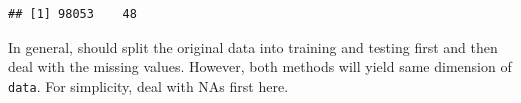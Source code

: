 \documentclass[]{article}
\newenvironment{Shaded}{\begin{snugshade}}{\end{snugshade}}
\newcommand{\KeywordTok}[1]{\textcolor[rgb]{0.13,0.29,0.53}{\textbf{{#1}}}}
\newcommand{\DataTypeTok}[1]{\textcolor[rgb]{0.13,0.29,0.53}{{#1}}}
\newcommand{\DecValTok}[1]{\textcolor[rgb]{0.00,0.00,0.81}{{#1}}}
\newcommand{\StringTok}[1]{\textcolor[rgb]{0.31,0.60,0.02}{{#1}}}
\newcommand{\NormalTok}[1]{{#1}}
\begin{document}
\begin{Shaded}
\end{Shaded}

\begin{verbatim}
## [1] 98053    48
\end{verbatim}

In general, should split the original data into training and testing
first and then deal with the missing values. However, both methods will
yield same dimension of \texttt{data}. For simplicity, deal with NAs
first here.
\end{document}
